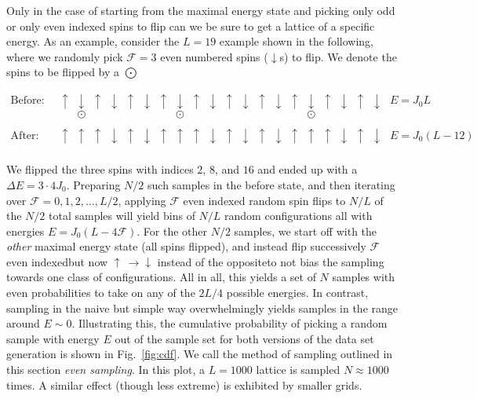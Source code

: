 \documentclass[a4paper, twocolumn]{article}
\newcommand{\fig}[1]{Fig.\ \ref{fig:#1}}
\begin{document}
\newcommand{\ua}{ \ \uparrow \ }
\newcommand{\da}{ \ \downarrow \ }
Only in the case of starting from the maximal energy state and picking only odd or only even indexed spins to flip can we be sure to get a lattice of a specific energy. As an example, consider the $L=19$ example shown in the following, where we randomly pick $\mathcal{F}=3$ even numbered spins ($\downarrow$s) to flip. We denote the spins to be flipped by a $\bigodot$
\begin{strip}
\begin{align}
\text{Before: } &\ua \underset{\bigodot}{\da} \ua \da \ua \da \ua \underset{\bigodot}{\da} \ua \da \ua \da \ua \da \ua \underset{\bigodot}{\da} \ua \da \ua \da \ \ E=J_0L \nonumber\\
\nonumber\\
\text{After: } &\ua \ua \ua \da \ua \da \ua \ua \ua \da \ua \da \ua \da \ua \ua \ua \da \ua \da \ \ E=J_0(L-12)\nonumber\\
\end{align}
\end{strip}
We flipped the three spins with indices $2$, $8$, and $16$ and ended up with a $\Delta E=3\cdot 4J_0$. Preparing $N/2$ such samples in the before state, and then iterating over $\mathcal{F}=0,1,2,\dots,L/2$, applying $\mathcal{F}$ even indexed random spin flips to $N/L$ of the $N/2$ total samples will yield bins of $N/L$ random configurations all with energies $E=J_0(L-4\mathcal{F})$. For the other $N/2$ samples, we start off with the \textit{other} maximal energy state (all spins flipped), and instead flip successively $\mathcal{F}$ even indexed\textemdash but now $\uparrow\ \rightarrow \downarrow$ instead of the opposite\textemdash to not bias the sampling towards one class of configurations. All in all, this yields a set of $N$ samples with even probabilities to take on any of the $2L/4$ possible energies. In contrast, sampling in the naive but simple way overwhelmingly yields samples in the range around $E\sim0$. Illustrating this, the cumulative probability of picking a random sample with energy $E$ out of the sample set for both versions of the data set generation is shown in \fig{cdf}. We call the method of sampling outlined in this section \textit{even sampling}. In this plot, a $L=1000$ lattice is sampled $N\approx1000$ times. A similar effect (though less extreme) is exhibited by smaller grids. 
\end{document}
